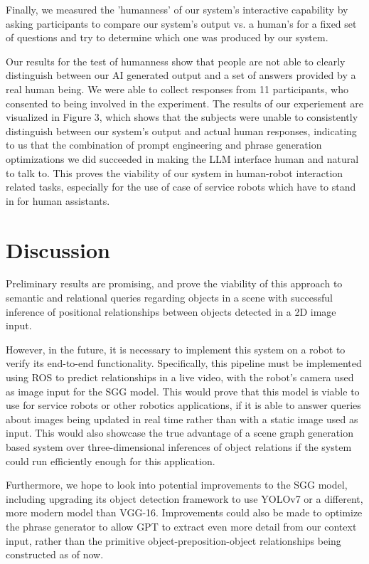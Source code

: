 \documentclass[letterpaper, 10 pt, conference]{ieeeconf}  %
\begin{document}
    Finally, we measured the 'humanness' of our system's interactive capability by asking participants to compare our system's output vs. a human's for a fixed set of questions and try to determine which one was produced by our system. 
    
    Our results for the test of humanness show that people are not able to clearly distinguish between our AI generated output and a set of answers provided by a real human being. We were able to collect responses from 11 participants, who consented to being involved in the experiment. The results of our experiement are visualized in Figure 3, which shows that the subjects were unable to consistently distinguish between our system's output and actual human responses, indicating to us that the combination of prompt engineering and phrase generation optimizations we did succeeded in making the LLM interface human and natural to talk to. This proves the viability of our system in human-robot interaction related tasks, especially for the use of case of service robots which have to stand in for human assistants.

\section{Discussion}
    Preliminary results are promising, and prove the viability of this approach to semantic and relational queries regarding objects in a scene with successful inference of positional relationships between objects detected in a 2D image input. 
    
    However, in the future, it is necessary to implement this system on a robot to verify its end-to-end functionality. Specifically, this pipeline must be implemented using ROS to predict relationships in a live video, with the robot's camera used as image input for the SGG model. This would prove that this model is viable to use for service robots or other robotics applications, if it is able to answer queries about images being updated in real time rather than with a static image used as input. This would also showcase the true advantage of a scene graph generation based system over three-dimensional inferences of object relations if the system could run efficiently enough for this application.

    Furthermore, we hope to look into potential improvements to the SGG model, including upgrading its object detection framework to use YOLOv7 or a different, more modern model than VGG-16. Improvements could also be made to optimize the phrase generator to allow GPT to extract even more detail from our context input, rather than the primitive object-preposition-object relationships being constructed as of now. 
    
\end{document}
